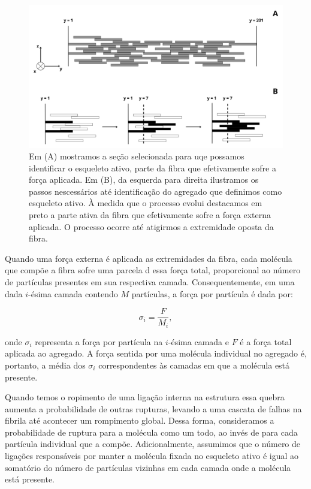 \documentclass{article}
\begin{document}
        \begin{figure}[H]
            \centering
            \includegraphics[width=\textwidth]{figures/esqueleto.png}
    
            \caption{Em (A) mostramos a seção selecionada para uqe possamos identificar o esqueleto ativo, parte da fibra 
            que efetivamente sofre a força aplicada. Em (B), da esquerda para direita ilustramos os passos nescessários 
            até identificação do agregado que definimos como esqueleto ativo. À medida que o processo evolui destacamos 
            em preto a parte ativa da fibra que efetivamente sofre a força externa aplicada. O processo ocorre até 
            atigirmos a extremidade oposta da fibra.}  
    
            \label{M3}
        \end{figure}

        Quando uma força externa é aplicada as extremidades da fibra, cada molécula que compõe a fibra sofre uma parcela d
        essa força total, proporcional ao número de partículas presentes em sua respectiva camada. Consequentemente, em 
        uma dada \(i\)-ésima camada contendo \(M\) partículas, a força por partícula é dada por:  

        \begin{equation}
            \sigma_{i} = \frac{F}{M_{i}},
        \end{equation}
            

        \noindent onde \(\sigma_{i}\) representa a força por partícula na \(i\)-ésima camada e \(F\) é a força total aplicada ao agregado. A força sentida 
        por uma molécula individual no agregado é, portanto, a média dos \(\sigma_{i}\) correspondentes às camadas em que a molécula está presente. 
        
        Quando temos o ropimento de uma ligação interna na estrutura essa quebra aumenta a probabilidade de outras rupturas, levando a uma cascata de 
        falhas na fibrila até acontecer um rompimento global. Dessa forma, consideramos a probabilidade 
        de ruptura para a molécula como um todo, ao invés de para cada partícula individual que a compõe. Adicionalmente, assumimos que o número de 
        ligações responsáveis por manter a molécula fixada no esqueleto ativo é igual ao somatório do número de partículas vizinhas em cada camada 
        onde a molécula está presente. 
\end{document}
